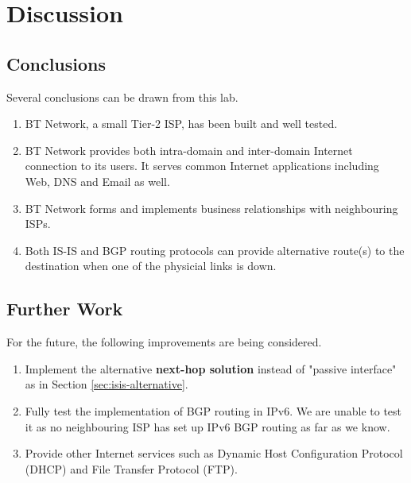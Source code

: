 \chapter{Discussion}
\label{chap:discussion}

\section{Conclusions}
Several conclusions can be drawn from this lab.

\begin{enumerate}
\item
  BT Network, a small Tier-2 ISP, has been built and well tested. 
\item
  BT Network provides both intra-domain and inter-domain Internet connection to its users. It serves common Internet applications including Web, DNS and Email as well.
\item
  BT Network forms and implements business relationships with neighbouring ISPs.
\item
  Both IS-IS and BGP routing protocols can provide alternative route(s) to the destination when one of the physicial links is down.  
\end{enumerate}


\section{Further Work}

For the future, the following improvements are being considered.

\begin{enumerate}
\item
  Implement the alternative \textbf{next-hop solution} instead of "passive interface" as in Section \ref{sec:isis-alternative}.
\item
  Fully test the implementation of BGP routing in IPv6. We are unable to test it as no neighbouring ISP has set up IPv6 BGP routing as far as we know.
\item
  Provide other Internet services such as Dynamic Host Configuration Protocol (DHCP)\citep{rfc2131} and File Transfer Protocol (FTP)\citep{rfc959}.
\end{enumerate}


